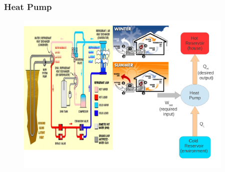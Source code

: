 \documentclass[10pt,compress]{beamer}
\begin{document}
\begin{frame}
 \frametitle{Heat Pump}
    \begin{figure}%
     \begin{center}
      \includegraphics[width=12.cm,height=7.8cm]{./Pics/Overview_Refrig35}
     \end{center}
    \end{figure}
\end{frame}
\end{document}
